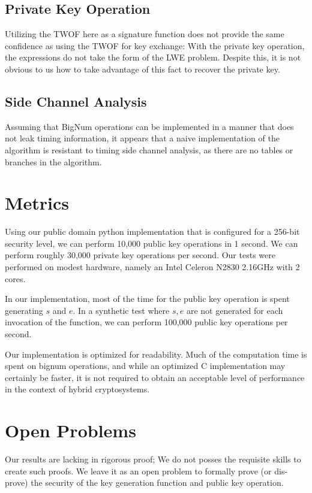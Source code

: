\documentclass[preprint]{iacrtrans}
\begin{document}
\subsection{Private Key Operation}
Utilizing the TWOF here as a signature function does not provide the same confidence as using the TWOF for key exchange: With the private key operation, the expressions do not take the form of the LWE problem. Despite this, it is not obvious to us how to take advantage of this fact to recover the private key.

\subsection{Side Channel Analysis}
Assuming that BigNum operations can be implemented in a manner that does not leak timing information, it appears that a naive implementation of the algorithm is resistant to timing side channel analysis, as there are no tables or branches in the algorithm.

\section{Metrics}
Using our public domain python implementation that is configured for a 256-bit security level, we can perform 10,000 public key operations in 1 second. We can perform roughly 30,000 private key operations per second. Our tests were performed on modest hardware, namely an Intel Celeron N2830 2.16GHz with 2 cores. 

In our implementation, most of the time for the public key operation is spent generating $s$ and $e$. In a synthetic test where $s, e$ are not generated for each invocation of the function, we can perform 100,000 public key operations per second.

Our implementation is optimized for readability. Much of the computation time is spent on bignum operations, and while an optimized C implementation may certainly be faster, it is not required to obtain an acceptable level of performance in the context of hybrid cryptosystems. 

\section{Open Problems}
Our results are lacking in rigorous proof; We do not posses the requisite skills to create such proofs. We leave it as an open problem to formally prove (or dis-prove) the security of the key generation function and public key operation.
\end{document}
